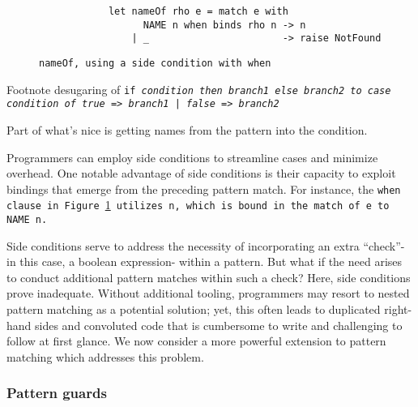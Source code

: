 \documentclass[manuscript,screen,review, 12pt]{acmart}
\begin{document}
\begin{outline}[enumerate]
        \begin{figure}[ht]
            \begin{verbatim}
            let nameOf rho e = match e with     
                  NAME n when binds rho n -> n
                | _                       -> raise NotFound  
                \end{verbatim}
            \caption{\tt{nameOf}, using a side condition with \tt{when}}    
            \label{fig:whennameof}
            \end{figure}

        
    \3 Footnote desugaring of \tt{if} \it{condition} \tt{then} \it{branch1} \tt{else} \it{branch2} to \tt{case} \it{condition} \tt{of} \tt{true =>} \it{branch1} \tt{| false =>} \it{branch2}
    
    \3 Part of what's nice is getting names from the pattern into the condition. 

    Programmers can employ side conditions to streamline cases and minimize
    overhead. One notable advantage of side conditions is their capacity to
    exploit bindings that emerge from the preceding pattern match. For
    instance, the \tt{when} clause in Figure~\ref{fig:whennameof} utilizes \tt{n},
    which is bound in the match of \tt{e} to \tt{NAME n}.

    Side conditions serve to address the necessity of incorporating an extra
    “check”- in this case, a boolean expression- within a pattern. But what if
    the need arises to conduct additional pattern matches within such a check?
    Here, side conditions prove inadequate. Without additional tooling,
    programmers may resort to nested pattern matching as a potential solution;
    yet, this often leads to duplicated right-hand sides and convoluted code
    that is cumbersome to write and challenging to follow at first glance. We
    now consider a more powerful extension to pattern matching which addresses
    this problem. 

 \subsubsection{Pattern guards}
\label{guards}



\end{outline}
\end{document}
